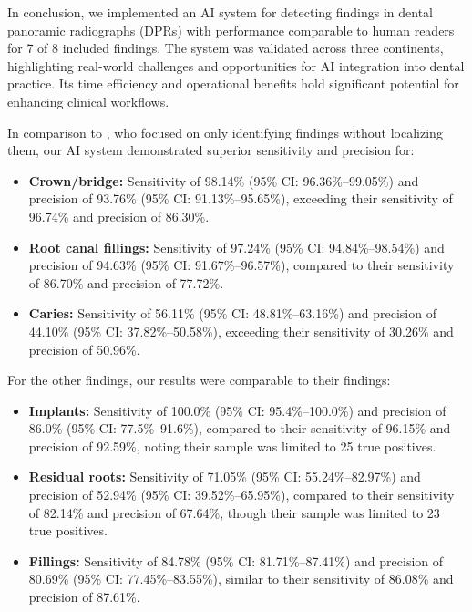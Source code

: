 In conclusion, we implemented an AI system for detecting findings in dental panoramic radiographs (DPRs) with performance comparable to human readers for 7 of 8 included findings.
The system was validated across three continents, highlighting real-world challenges and opportunities for AI integration into dental practice.
Its time efficiency and operational benefits hold significant potential for enhancing clinical workflows.



\iffalse

In comparison to \citet{bacsaran2022diagnostic}, who focused on only identifying findings without localizing them, our AI system demonstrated superior sensitivity and precision for:
\begin{itemize}
    \item \textbf{Crown/bridge:} Sensitivity of 98.14\% (95\% CI: 96.36\%--99.05\%) and precision of 93.76\% (95\% CI: 91.13\%--95.65\%), exceeding their sensitivity of 96.74\% and precision of 86.30\%.
    \item \textbf{Root canal fillings:} Sensitivity of 97.24\% (95\% CI: 94.84\%--98.54\%) and precision of 94.63\% (95\% CI: 91.67\%--96.57\%), compared to their sensitivity of 86.70\% and precision of 77.72\%.
    \item \textbf{Caries:} Sensitivity of 56.11\% (95\% CI: 48.81\%--63.16\%) and precision of 44.10\% (95\% CI: 37.82\%--50.58\%), exceeding their sensitivity of 30.26\% and precision of 50.96\%.
\end{itemize}

For the other findings, our results were comparable to their findings:
\begin{itemize}
    \item \textbf{Implants:} Sensitivity of 100.0\% (95\% CI: 95.4\%--100.0\%) and precision of 86.0\% (95\% CI: 77.5\%--91.6\%), compared to their sensitivity of 96.15\% and precision of 92.59\%, noting their sample was limited to 25 true positives.
    \item \textbf{Residual roots:} Sensitivity of 71.05\% (95\% CI: 55.24\%--82.97\%) and precision of 52.94\% (95\% CI: 39.52\%--65.95\%), compared to their sensitivity of 82.14\% and precision of 67.64\%, though their sample was limited to 23 true positives.
    \item \textbf{Fillings:} Sensitivity of 84.78\% (95\% CI: 81.71\%--87.41\%) and precision of 80.69\% (95\% CI: 77.45\%--83.55\%), similar to their sensitivity of 86.08\% and precision of 87.61\%.
\end{itemize}

